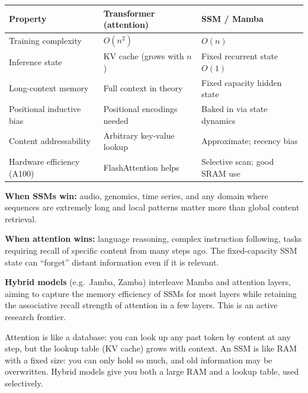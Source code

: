 \begin{center}
\begin{tabular}{lll}
\toprule
\textbf{Property} & \textbf{Transformer (attention)} & \textbf{SSM / Mamba} \\
\midrule
Training complexity & $O(n^2)$ & $O(n)$ \\
Inference state & KV cache (grows with $n$) & Fixed recurrent state $O(1)$ \\
Long-context memory & Full context in theory & Fixed capacity hidden state \\
Positional inductive bias & Positional encodings needed & Baked in via state dynamics \\
Content addressability & Arbitrary key-value lookup & Approximate; recency bias \\
Hardware efficiency (A100) & FlashAttention helps & Selective scan; good SRAM use \\
\bottomrule
\end{tabular}
\end{center}

\textbf{When SSMs win:} audio, genomics, time series, and any domain where sequences
are extremely long and local patterns matter more than global content retrieval.

\textbf{When attention wins:} language reasoning, complex instruction following, tasks
requiring recall of specific content from many steps ago. The fixed-capacity SSM state
can ``forget'' distant information even if it is relevant.

\textbf{Hybrid models} (e.g.\ Jamba, Zamba) interleave Mamba and attention layers,
aiming to capture the memory efficiency of SSMs for most layers while retaining the
associative recall strength of attention in a few layers. This is an active research
frontier.

\begin{intuitionbox}
  Attention is like a database: you can look up any past token by content at any step,
  but the lookup table (KV cache) grows with context. An SSM is like RAM with a
  fixed size: you can only hold so much, and old information may be overwritten.
  Hybrid models give you both a large RAM and a lookup table, used selectively.
\end{intuitionbox}
